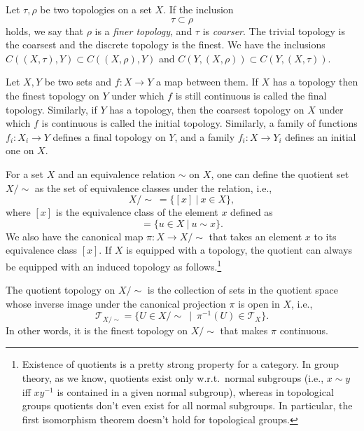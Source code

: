 \begin{defn}
    Let $\tau,\rho$ be two topologies on a set $X$. If the inclusion
    \[\tau \subset \rho\]
    holds, we say that $\rho$ is a \emph{finer topology}, and $\tau$ is \emph{coarser}. The trivial topology is the coarsest and the discrete topology is the finest. We have the inclusions $C((X,\tau),Y)\subset C((X,\rho),Y)$ and $C(Y,(X,\rho))\subset C(Y,(X,\tau))$.
\end{defn}

\begin{defn}
    Let $X,Y$ be two sets and $f:X\to Y$ a map between them. If $X$ has a topology then the finest topology on $Y$ under which $f$ is still continuous is called the final topology. Similarly, if $Y$ has a topology, then the coarsest topology on $X$ under which $f$ is continuous is called the initial topology. Similarly, a family of functions $f_i:X_i\to Y$ defines a final topology on $Y$, and a family $f_i:X\to Y_i$ defines an initial one on $X$.
\end{defn}

For a set $X$ and an equivalence relation $\sim$ on $X$, one can define the quotient set $X/\sim$ as the set of equivalence classes under the relation, i.e.,
\begin{equation}
    X/\sim ~ = \{ [x] ~|~ x\in X \},
\end{equation}
where $[x]$ is the equivalence class of the element $x$ defined as
\begin{equation}
    [x] = \{u\in X ~|~ u \sim x\}.
\end{equation}
We also have the canonical map $\pi:X\rightarrow X/\sim$ that takes an element $x$ to its equivalence class $[x]$. If $X$ is equipped with a topology, the quotient can always be equipped with an induced topology as follows.\footnote{Existence of quotients is a pretty strong property for a category. In group theory, as we know, quotients exist only w.r.t.\ normal subgroups (i.e., $x\sim y$ iff $xy^{-1}$ is contained in a given normal subgroup), whereas in topological groups quotients don't even exist for all normal subgroups. In particular, the first isomorphism theorem doesn't hold for topological groups.}


\begin{defn}
The quotient topology on $X/\sim$ is the collection of sets  in the quotient space whose inverse image under the canonical projection $\pi$ is open in $X$, i.e.,
\begin{equation}
    \mathcal{T}_{X/\sim} = \{U\in X/\sim ~ \mid ~ \pi^{-1}(U) \in \mathcal{T}_X\}.
\end{equation}
In other words, it is the finest topology on $X/\sim$ that makes $\pi$ continuous.
\end{defn}

